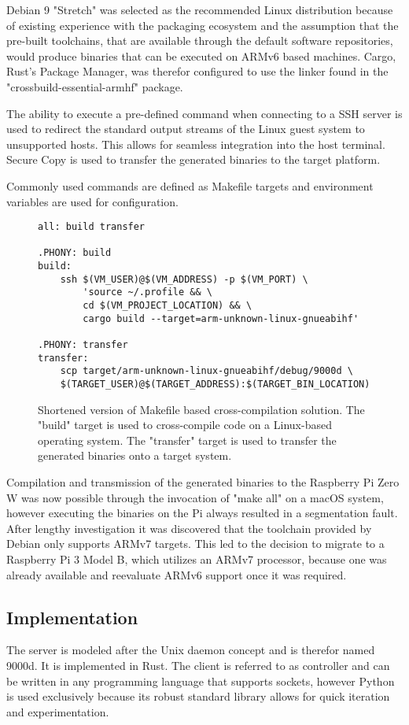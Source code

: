 Debian 9 "Stretch" was selected as the recommended Linux distribution because of existing experience with the packaging ecosystem and the assumption that the pre-built toolchains, that are available through the default software repositories, would produce binaries that can be executed on ARMv6 based machines. Cargo, Rust’s Package Manager, was therefor configured to use the linker found in the "crossbuild-essential-armhf" package.

The ability to execute a pre-defined command when connecting to a SSH server is used to redirect the standard output streams of the Linux guest system to unsupported hosts. This allows for seamless integration into the host terminal. Secure Copy is used to transfer the generated binaries to the target platform.

Commonly used commands are defined as Makefile targets and environment variables are used for configuration.

\begin{figure}[h]
\begin{verbatim}
all: build transfer

.PHONY: build
build:
	ssh $(VM_USER)@$(VM_ADDRESS) -p $(VM_PORT) \
		'source ~/.profile && \
		cd $(VM_PROJECT_LOCATION) && \
		cargo build --target=arm-unknown-linux-gnueabihf'

.PHONY: transfer
transfer:
	scp target/arm-unknown-linux-gnueabihf/debug/9000d \
	$(TARGET_USER)@$(TARGET_ADDRESS):$(TARGET_BIN_LOCATION)
\end{verbatim}
\caption{Shortened version of Makefile based cross-compilation solution. The "build" target is used to cross-compile code on a Linux-based operating system. The "transfer" target is used to transfer the generated binaries onto a target system.}
\end{figure}

Compilation and transmission of the generated binaries to the Raspberry Pi Zero W was now possible through the invocation of "make all" on a macOS system, however executing the binaries on the Pi always resulted in a segmentation fault. After lengthy investigation it was discovered that the toolchain provided by Debian only supports ARMv7 targets. This led to the decision to migrate to a Raspberry Pi 3 Model B, which utilizes an ARMv7 processor, because one was already available and reevaluate ARMv6 support once it was required.

\subsection{Implementation}
The server is modeled after the Unix daemon concept and is therefor named 9000d. It is implemented in Rust. The client is referred to as controller and can be written in any programming language that supports sockets, however Python is used exclusively because its robust standard library allows for quick iteration and experimentation.

